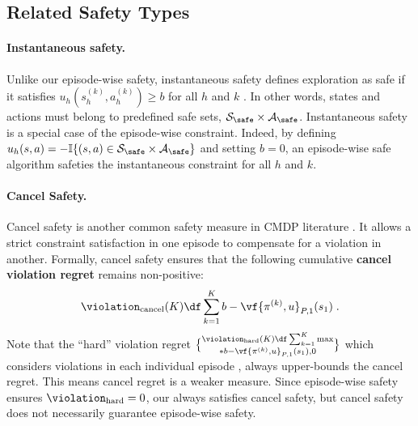 \subsection{Related Safety Types}

\paragraph{Instantaneous safety.}
Unlike our episode-wise safety, instantaneous safety defines exploration as safe if it satisfies \( u_h(s^{(k)}_h, a^{(k)}_h) \geq b \) for all \( h \) and \( k \) \citep{pacchiano2021stochastic, pacchiano2024contextual, hutchinson2024directional, shi2023near, amani2021safe}.  
In other words, states and actions must belong to predefined safe sets, \( \mathcal{S}_\safe \times \mathcal{A}_\safe \).  
Instantaneous safety is a special case of the episode-wise constraint. Indeed, by defining \( u_h(s, a) = -\mathbb{I}\{(s, a) \in \mathcal{S}_\safe \times \mathcal{A}_\safe\} \) and setting \( b = 0 \), an episode-wise safe algorithm safeties the instantaneous constraint for all \( h \) and \( k \).

\paragraph{Cancel Safety.}
Cancel safety is another common safety measure in CMDP literature \citet{wei2021provably,ghosh2022provably}.
It allows a strict constraint satisfaction in one episode to compensate for a violation in another. 
Formally, cancel safety ensures that the following cumulative \textbf{cancel violation regret} remains non-positive:
$$\violation_{\mathrm{cancel}}(K) \df \sum^K_{k=1} b - \vf{\pi^{(k)}, u}_{P, 1}(s_1)\;.$$
Note that the ``hard'' violation regret $\violation_{\mathrm{hard}}(K) \df \sum^K_{k=1} \max\brace*{b - \vf{\pi^{(k)}, u}_{P, 1}(s_1), 0}$ which considers violations in each individual episode \citep{ghosh2024towards, efroni2020exploration, muller2024truly}, always upper-bounds the cancel regret. This means cancel regret is a weaker measure.
Since episode-wise safety ensures $\violation_{\mathrm{hard}}=0$, our \MDPalgo always satisfies cancel safety, but cancel safety does not necessarily guarantee episode-wise safety.



